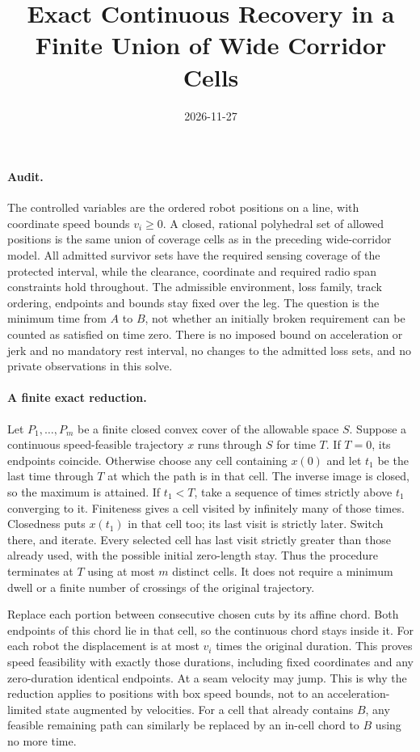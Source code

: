 \documentclass[11pt]{article}
\title{Exact Continuous Recovery in a Finite Union of Wide Corridor Cells}
\date{2026-11-27}
\begin{document}
\maketitle

\paragraph{Audit.}
The controlled variables are the ordered robot positions on a line,
with coordinate speed bounds \(v_i\geq0\). A closed, rational polyhedral
set of allowed positions is the same union of coverage cells as in
the preceding wide-corridor model. All admitted survivor sets have the
required sensing coverage of the protected interval, while the
clearance, coordinate and required radio span constraints hold throughout.
The admissible environment, loss family, track ordering, endpoints and
bounds stay fixed over the leg. The question is the minimum time
from \(A\) to \(B\), not whether an initially broken requirement can
be counted as satisfied on time zero. There is no imposed bound on
acceleration or jerk and no mandatory rest interval, no changes to the
admitted loss sets, and no private observations in this solve.

\paragraph{A finite exact reduction.}
Let \(P_1,\ldots,P_m\) be a finite closed convex cover of the allowable
space \(S\). Suppose a continuous speed-feasible trajectory \(x\)
runs through \(S\) for time \(T\). If \(T=0\), its endpoints coincide.
Otherwise choose any cell containing \(x(0)\) and let \(t_1\) be
the last time through \(T\) at which the path is in that cell.
The inverse image is closed, so the maximum is attained.
If \(t_1<T\), take a sequence of times strictly above \(t_1\)
converging to it. Finiteness gives a cell visited by infinitely
many of those times. Closedness puts \(x(t_1)\) in that cell too;
its last visit is strictly later. Switch there, and iterate.
Every selected cell has last visit strictly greater than those
already used, with the possible initial zero-length stay.
Thus the procedure terminates at \(T\) using at most \(m\) distinct
cells. It does not require a minimum dwell or a finite number of
crossings of the original trajectory.

Replace each portion between consecutive chosen cuts by its affine
chord. Both endpoints of this chord lie in that cell, so the
continuous chord stays inside it. For each robot the displacement
is at most \(v_i\) times the original duration. This proves
speed feasibility with exactly those durations, including fixed
coordinates and any zero-duration identical endpoints. At a seam
velocity may jump. This is why the reduction applies to positions
with box speed bounds, not to an acceleration-limited state
augmented by velocities. For a cell that already contains
\(B\), any feasible remaining path can similarly be replaced
by an in-cell chord to \(B\) using no more time.
\end{document}
